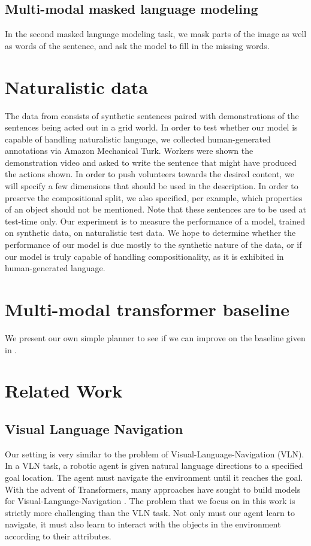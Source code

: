 \documentclass[11pt]{article}
\begin{document}
\subsection{Multi-modal masked language modeling}
%
In the second masked language modeling task, we mask parts of the image as well as words of the sentence, and ask the model to fill in the missing words.

\section{Naturalistic data}

The data from \citet{ruis2020benchmark} consists of synthetic sentences paired with demonstrations of the sentences being acted out in a grid world.
%
In order to test whether our model is capable of handling naturalistic language, we collected human-generated annotations via Amazon Mechanical Turk.
%
Workers were shown the demonstration video and asked to write the sentence that might have produced the actions shown.
%
In order to push volunteers towards the desired content, we will specify a few dimensions that should be used in the description.
%
In order to preserve the compositional split, we also specified, per example, which properties of an object should not be mentioned.
%
Note that these sentences are to be used at test-time only.
%
Our experiment is to measure the performance of a model, trained on synthetic data, on naturalistic test data.
%
We hope to determine whether the performance of our model is due mostly to the synthetic nature of the data, or if our model is truly capable of handling compositionality, as it is exhibited in human-generated language. 

\section{Multi-modal transformer baseline}
\label{transformer-planner}
We present our own simple planner to see if we can improve on the baseline given in \cite{ruis2020benchmark}.

\section{Related Work}
\subsection{Visual Language Navigation}
Our setting is very similar to the problem of Visual-Language-Navigation (VLN). 
%
In a VLN task, a robotic agent is given natural language directions to a specified goal location. 
%
The agent must navigate the environment until it reaches the goal.
%
With the advent of Transformers, many approaches have sought to build models for Visual-Language-Navigation \citep{magassouba2021crossmap, fang2019scene, Chen2020TopologicalPW}.
%
The problem that we focus on in this work is strictly more challenging than the VLN task. 
%
Not only must our agent learn to navigate, it must also learn to interact with the objects in the environment according to their attributes.
\end{document}
